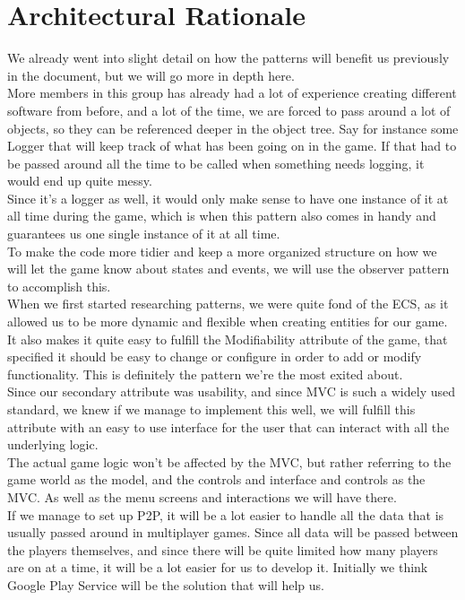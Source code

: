 \section{Architectural Rationale}
We already went into slight detail on how the patterns will benefit us previously in the document, but we will go more in depth here.
\\More members in this group has already had a lot of experience creating different software from before, and a lot of the time, we are forced to pass around a lot of objects, so they can be referenced deeper in the object tree. Say for instance some Logger that will keep track of what has been going on in the game. If that had to be passed around all the time to be called when something needs logging, it would end up quite messy. 
\\Since it's a logger as well, it would only make sense to have one instance of it at all time during the game, which is when this pattern also comes in handy and guarantees us one single instance of it at all time.
\\ To make the code more tidier and keep a more organized structure on how we will let the game know about states and events, we will use the observer pattern to accomplish this.
\\ When we first started researching patterns, we were quite fond of the ECS, as it allowed us to be more dynamic and flexible when creating entities for our game. It also makes it quite easy to fulfill the Modifiability attribute of the game, that specified it should be easy to change or configure in order to add or modify functionality. This is definitely the pattern we're the most exited about.
\\ Since our secondary attribute was usability, and since MVC is such a widely used standard, we knew if we manage to implement this well, we will fulfill this attribute with an easy to use interface for the user that can interact with all the underlying logic.
\\The actual game logic won't be affected by the MVC, but rather referring to the game world as the model, and the controls and interface and controls as the MVC. As well as the menu screens and interactions we will have there.
\\ If we manage to set up P2P, it will be a lot easier to handle all the data that is usually passed around in multiplayer games. Since all data will be passed between the players themselves, and since there will be quite limited how many players are on at a time, it will be a lot easier for us to develop it. Initially we think Google Play Service will be the solution that will help us.
